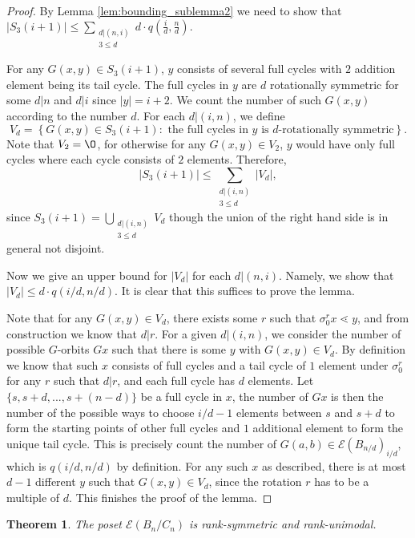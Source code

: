 \documentclass[10 pt]{amsart}
\theoremstyle{plain}
\newtheorem{thm}{Theorem}[section]
\theoremstyle{definition}
\theoremstyle{remark}
\numberwithin{equation}{section}
\begin{document}
\begin{proof} 


By Lemma \ref{lem:bounding_sublemma2} we need to show that $\displaystyle |S_3(i+1)| \le \sum_{\substack{d | (n , i) \\ 3 \le d }} d \cdot q \left(\frac{i}{d},\frac{n}{d}\right)  .$ 


For any $G(x, y) \in S_3(i+1)$, $y$ consists of several full cycles with $2$ addition element being its tail cycle. The full cycles in $y$ are $d$ rotationally symmetric for some $d | n$ and $d | i$ since $|y| = i+2$. We count the number of such $G(x,y)$ according to the number $d$. For each $d| (i, n)$, we define $$V_d = \left\{G(x, y) \in S_3(i+1) : \text{ the full cycles in $y$ is $d$-rotationally symmetric} \right\}.$$ Note that $V_2 = \O$, for otherwise for any $G(x, y) \in V_2$, $y$ would have only full cycles where each cycle consists of $2$ elements. Therefore, $$|S_3(i+1)| \le \displaystyle \sum_{\substack{d| (i, n) \\ 3 \le d}} |V_d|,$$ since $S_3(i+1) = \bigcup_{\substack{d| (i, n) \\ 3 \le d}} V_d$ though the union of the right hand side is in general not disjoint. 

Now we give an upper bound for $|V_d|$ for each $d | (n, i)$. Namely, we show that $|V_d| \le d \cdot q (i/d, n/d)$. It is clear that this suffices to prove the lemma.

Note that for any $G(x, y) \in V_d$, there exists some $r$ such that $\sigma_0^r x \lessdot y$, and from construction we know that $d | r$. For a given $d | (i, n)$, we consider the number of possible $G$-orbits $Gx$ such that there is some $y$ with $G(x, y) \in V_d$. By definition we know that such $x$ consists of full cycles and a tail cycle of $1$ element under $\sigma_0^r$ for any $r$ such that $d |r$, and each full cycle has $d$ elements. Let $\{s, s+d, ..., s+(n-d)\}$ be a full cycle in $x$, the number of $Gx$ is then the number of the possible ways to choose $i/d -1$ elements between $s$ and $s+d$ to form the starting points of other full cycles and $1$ additional element to form the unique tail cycle. This is precisely count the number of $G(a,b) \in \mathcal E (B_{n/d})_{i/d}$, which is $q(i/d, n/d)$ by definition. For any such $x$ as described, there is at most $d-1$ different $y$ such that $G(x,y) \in V_d$, since the rotation $r$ has to be a multiple of $d$. This finishes the proof of the lemma.
\end{proof}


\begin{thm}{\label{cor:cyclic_unimodal}} 
The poset $\mathcal E(B_n/C_n)$ is rank-symmetric and rank-unimodal.
\end{thm}
\end{document}
